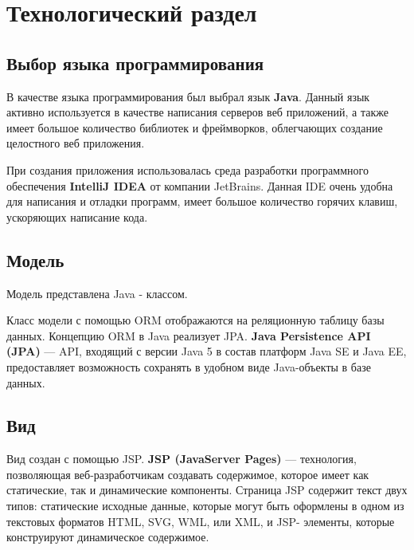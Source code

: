 \chapter{Технологический раздел}

\section{Выбор языка программирования}
В качестве языка программирования был выбрал язык \textbf{Java}. Данный язык активно используется в качестве написания серверов веб приложений, а также имеет большое количество библиотек и фреймворков, облегчающих создание целостного веб приложения.

При создания приложения использовалась среда разработки программного обеспечения \textbf{IntelliJ IDEA} от компании JetBrains. Данная IDE очень удобна для написания и отладки программ, имеет большое количество горячих клавиш, ускоряющих написание кода.  

\section{Модель}

Модель представлена Java - классом.

 

Класс модели с помощью ORM отображаются на реляционную таблицу базы данных. Концепцию ORM в Java реализует JPA. \textbf{Java Persistence API (JPA)} — API, входящий с версии Java 5 в состав платформ Java SE и Java EE, предоставляет возможность сохранять в удобном виде Java-объекты в базе данных.

 

\section{Вид}

Вид создан с помощью JSP. \textbf{JSP (JavaServer Pages)} — технология, позволяющая веб-разработчикам создавать содержимое, которое имеет как статические, так и динамические компоненты. Страница JSP содержит текст двух типов: статические исходные данные, которые могут быть оформлены в одном из текстовых форматов HTML, SVG, WML, или XML, и JSP- элементы, которые конструируют динамическое содержимое.

 


